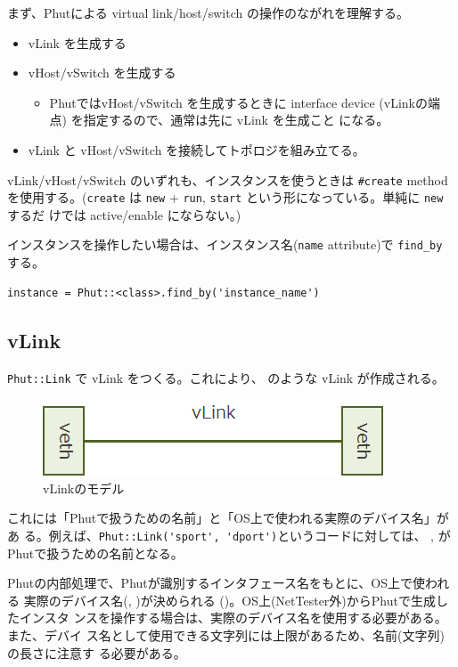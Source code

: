まず、Phutによる virtual link/host/switch の操作のながれを理解する。
\begin{itemize}
 \item vLink を生成する
 \item vHost/vSwitch を生成する
       \begin{itemize}
        \item PhutではvHost/vSwitch を生成するときに interface device
              (vLinkの端点) を指定するので、通常は先に vLink を生成こと
              になる。
       \end{itemize}
 \item vLink と vHost/vSwitch を接続してトポロジを組み立てる。
\end{itemize}

vLink/vHost/vSwitch のいずれも、インスタンスを使うときは \verb|#create|
method を使用する。(\verb|create| は \verb|new| +
\verb|run|, \verb|start| という形になっている。単純に \verb|new| するだ
けでは active/enable にならない。)

インスタンスを操作したい場合は、インスタンス名(\verb|name| attribute)で
\verb|find_by| する。

\begin{lstlisting}[title=\code{\#find\_by}メソッド利用例]
instance = Phut::<class>.find_by('instance_name')
\end{lstlisting}

\subsection{vLink}

\verb|Phut::Link| で vLink をつくる。これにより、
のような vLink が作成される。

\begin{figure}[h]
 \centering
 \includegraphics[scale=0.6]{img/phut-vlink-model.png}
 \caption{vLinkのモデル}
 \label{fig:vlink-model}
\end{figure}

これには「Phutで扱うための名前」と「OS上で使われる実際のデバイス名」があ
る。例えば、\verb|Phut::Link('sport', 'dport')|というコードに対しては、
, がPhutで扱うための名前となる。

Phutの内部処理で、Phutが識別するインタフェース名をもとに、OS上で使われる
実際のデバイス名(, )が決められる
()。OS上(NetTester外)からPhutで生成したインスタ
ンスを操作する場合は、実際のデバイス名を使用する必要がある。また、デバイ
ス名として使用できる文字列には上限があるため、名前(文字列)の長さに注意す
る必要がある。


